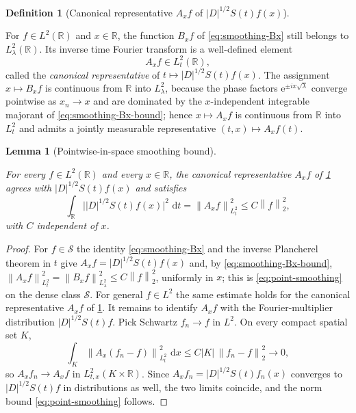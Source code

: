 \documentclass[11pt,oneside]{book}
\providecommand{\uses}[1]{}
\newtheorem{lemma}[theorem]{Lemma}
\theoremstyle{definition}
\newtheorem{definition}[theorem]{Definition}
\theoremstyle{remark}
\newcommand{\R}{\mathbb R}
\newcommand{\Ssch}{\mathcal S}
\newcommand{\1}{\mathbf 1}
\newcommand{\dd}{\,\mathrm d}
\newcommand{\norm}[1]{\left\lVert #1\right\rVert}
\newcommand{\e}{\mathrm e}
\begin{document}
\begin{definition}[Canonical representative $A_xf$ of $|D|^{1/2}S(t)f(x)$]\label{def:Ax-representative}
\uses{def:homogeneous-multiplier, def:propagator, lem:homogeneous-smoothing-identity}
For $f\in L^2(\R)$ and $x\in\R$, the function $B_xf$ of \eqref{eq:smoothing-Bx}
still belongs to $L^2_\lambda(\R)$. Its inverse time Fourier transform is a
well-defined element
\[
 A_xf\in L^2_t(\R),
\]
called the \emph{canonical representative} of $t\mapsto|D|^{1/2}S(t)f(x)$. The
assignment $x\mapsto B_xf$ is continuous from $\R$ into $L^2_\lambda$, because the
phase factors $\e^{\pm ix\sqrt\lambda}$ converge pointwise as $x_n\to x$ and are
dominated by the $x$-independent integrable majorant of
\eqref{eq:smoothing-Bx-bound}; hence $x\mapsto A_xf$ is continuous from $\R$ into
$L^2_t$ and admits a jointly measurable representative $(t,x)\mapsto A_xf(t)$.
\end{definition}

\begin{lemma}[Pointwise-in-space smoothing bound]\label{lem:point-smoothing}
\uses{def:Ax-representative, lem:homogeneous-smoothing-identity, def:propagator, def:homogeneous-multiplier}
For every $f\in L^2(\R)$ and every $x\in\R$, the canonical representative
$A_xf$ of \cref{def:Ax-representative} agrees with $|D|^{1/2}S(t)f(x)$ and
satisfies
\begin{equation}
 \int_\R\big| |D|^{1/2}S(t)f(x)\big|^2\,\dd t
 =\norm{A_xf}_{L^2_t}^2
 \le C\norm f_2^2 ,
 \label{eq:point-smoothing}
\end{equation}
with $C$ independent of $x$.
\end{lemma}

\begin{proof}
\uses{lem:homogeneous-smoothing-identity, def:Ax-representative}
For $f\in\Ssch$ the identity \eqref{eq:smoothing-Bx} and the inverse Plancherel
theorem in $t$ give $A_xf=|D|^{1/2}S(t)f(x)$ and, by
\eqref{eq:smoothing-Bx-bound}, $\norm{A_xf}_{L^2_t}^2=\norm{B_xf}_{L^2_\lambda}^2
\le C\norm f_2^2$, uniformly in $x$; this is \eqref{eq:point-smoothing} on the
dense class $\Ssch$. For general $f\in L^2$ the same estimate holds for the
canonical representative $A_xf$ of \cref{def:Ax-representative}. It remains to
identify $A_xf$ with the Fourier-multiplier distribution $|D|^{1/2}S(t)f$. Pick
Schwartz $f_n\to f$ in $L^2$. On every compact spatial set $K$,
\[
 \int_K\norm{A_x(f_n-f)}_{L^2_t}^2\,\dd x
 \le C|K|\,\norm{f_n-f}_2^2\longrightarrow 0 ,
\]
so $A_xf_n\to A_xf$ in $L^2_{t,x}(K\times\R)$. Since $A_xf_n=|D|^{1/2}S(t)f_n(x)$
converges to $|D|^{1/2}S(t)f$ in distributions as well, the two limits coincide,
and the norm bound \eqref{eq:point-smoothing} follows.
\end{proof}
\end{document}
